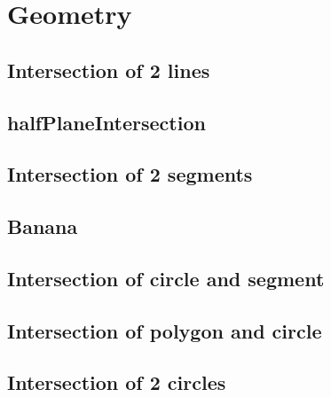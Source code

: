 \documentclass[a4paper,10pt,twocolumn,oneside]{article}
\begin{document}
\section{Geometry}

% 

\subsection{Intersection of 2 lines}


\subsection{halfPlaneIntersection}


% 

\subsection{Intersection of 2 segments}


\subsection{Banana}


\subsection{Intersection of circle and segment}


\subsection{Intersection of polygon and circle}


\subsection{Intersection of 2 circles}
\end{document}
